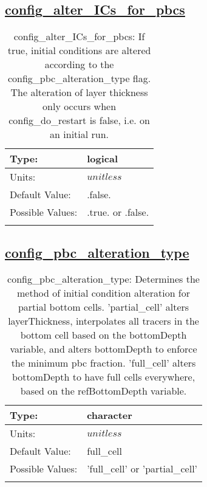 \subsection[config\_alter\_ICs\_for\_pbcs]{\hyperref[sec:nm_tab_partial_bottom_cells]{config\_alter\_ICs\_for\_pbcs}}
\label{subsec:nm_sec_config_alter_ICs_for_pbcs}
\begin{center}
\begin{longtable}{| p{2.0in} || p{4.0in} |}
    \hline
    Type: & logical \\
    \hline
    Units: & $unitless$ \\
    \hline
    Default Value: & .false. \\
    \hline
    Possible Values: & .true. or .false. \\
    \hline
    \caption{config\_alter\_ICs\_for\_pbcs: If true, initial conditions are altered according to the config\_pbc\_alteration\_type flag. The alteration of layer thickness only occurs when config\_do\_restart is false, i.e. on an initial run.}
\end{longtable}
\end{center}
\subsection[config\_pbc\_alteration\_type]{\hyperref[sec:nm_tab_partial_bottom_cells]{config\_pbc\_alteration\_type}}
\label{subsec:nm_sec_config_pbc_alteration_type}
\begin{center}
\begin{longtable}{| p{2.0in} || p{4.0in} |}
    \hline
    Type: & character \\
    \hline
    Units: & $unitless$ \\
    \hline
    Default Value: & full\_cell \\
    \hline
    Possible Values: & 'full\_cell' or 'partial\_cell' \\
    \hline
    \caption{config\_pbc\_alteration\_type: Determines the method of initial condition alteration for partial bottom cells. 'partial\_cell' alters layerThickness, interpolates all tracers in the bottom cell based on the bottomDepth variable, and alters bottomDepth to enforce the minimum pbc fraction. 'full\_cell' alters bottomDepth to have full cells everywhere, based on the refBottomDepth variable.}
\end{longtable}
\end{center}
